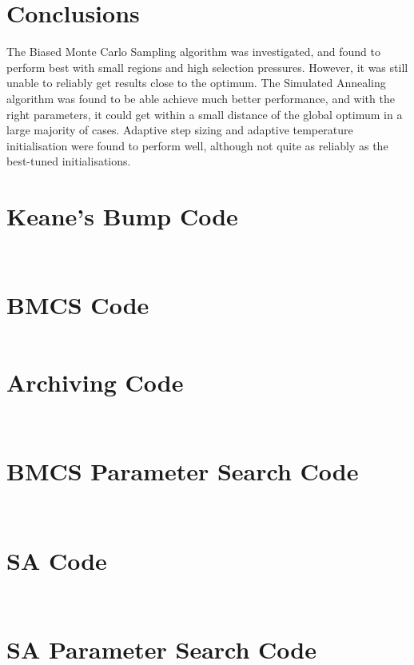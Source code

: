 \documentclass[10pt]{article}
\begin{document}
\section{Conclusions}

The Biased Monte Carlo Sampling algorithm was investigated, and found to
perform best with small regions and high selection pressures. However, it was
still unable to reliably get results close to the optimum. The Simulated
Annealing algorithm was found to be able achieve much better performance, and
with the right parameters, it could get within a small distance of the global
optimum in a large majority of cases. Adaptive step sizing \cite{parks} and
adaptive temperature initialisation \cite{kirk} \cite{white:261} were found to
perform well, although not quite as reliably as the best-tuned
initialisations.

{}


\pagebreak
\appendix

\section{Keane's Bump Code}

\inputminted[linenos,fontsize=\small]{matlab}{bump.m}
\inputminted[linenos,fontsize=\small]{matlab}{bump_penalty.m}

\section{BMCS Code}

\inputminted[linenos,fontsize=\small]{matlab}{bsmc.m}

\section{Archiving Code}

\inputminted[linenos,fontsize=\small]{matlab}{archive_new.m}
\inputminted[linenos,fontsize=\small]{matlab}{archive_add.m}

\section{BMCS Parameter Search Code}

\inputminted[linenos,fontsize=\small]{matlab}{bsmc_wrapper.m}
\inputminted[linenos,fontsize=\small]{matlab}{evaluate.m}

\section{SA Code}

\inputminted[linenos,fontsize=\small]{matlab}{sa.m}
\inputminted[linenos,fontsize=\small]{c}{sa.c}

\section{SA Parameter Search Code}

\inputminted[linenos,fontsize=\small]{matlab}{cli_evaluate.m}
\end{document}
